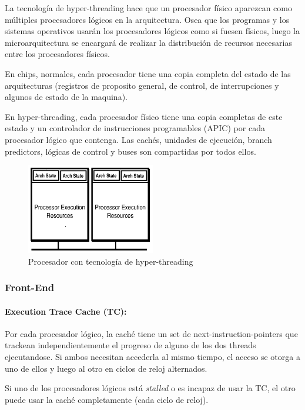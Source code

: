 La tecnología de hyper-threading hace que un procesador físico aparezcan como múltiples procesadores lógicos en la arquitectura. Osea que los programas y los sistemas operativos usarán los procesadores lógicos como si fuesen físicos, luego la microarquitectura se encargará de realizar la distribución de recursos necesarias entre los procesadores físicos.

En chips, normales, cada procesador tiene una copia completa del estado de las arquitecturas (registros de proposito general, de control, de interrupciones y algunos de estado de la maquina). 

En hyper-threading, cada procesador físico tiene una copia completas de este estado y un controlador de instrucciones programables (APIC) por cada procesador lógico que contenga.  Las cachés, unidades de ejecución, branch predictors, lógicas de control y buses son compartidas por todos ellos.

\begin{figure}[ht]
	\centering
	\includegraphics[width=0.5\textwidth]{imagenes/multithreading-procesor}
	\caption{Procesador con tecnología de hyper-threading}
	\label{fig:xenonHyperThreadingTechnology}
\end{figure}

\subsubsection{Front-End}
\paragraph{Execution Trace Cache (TC):}
Por cada procesador lógico, la caché tiene un set de next-instruction-pointers que trackean independientemente el progreso de alguno de los dos threads ejecutandose. Si ambos necesitan accederla al mismo tiempo, el acceso se otorga a uno de ellos y luego al otro en ciclos de reloj alternados.
	
Si uno de los procesadores lógicos está \textit{stalled} o es incapaz de usar la TC, el otro puede usar la caché completamente (cada ciclo de reloj).

